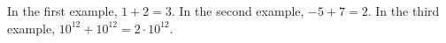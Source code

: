 In the first example, $1+2=3$.
In the second example, $-5+7=2$.
In the third example, $10^{12}+10^{12}=2\cdot 10^{12}$.
